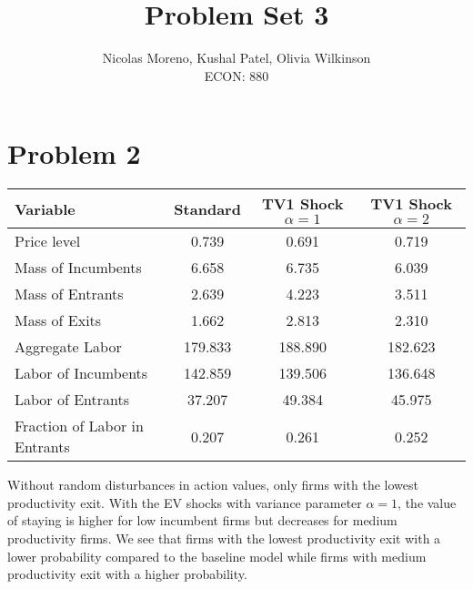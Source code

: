 \documentclass[10pt]{article}
\begin{document}
 
\title{Problem Set 3}
\author{Nicolas Moreno, Kushal Patel, Olivia Wilkinson \\
ECON: 880}
\maketitle

\section{Problem 2}
\begin{table}[!h]
    \centering
    \begin{tabular}{@{}lccc@{}}
    \toprule
    \textbf{Variable}             & \textbf{Standard} & \textbf{TV1 Shock $\alpha = 1$} & \textbf{TV1 Shock $\alpha = 2$} \\ \midrule
    Price level                   & 0.739             & 0.691                           & 0.719                           \\
    Mass of Incumbents            & 6.658             & 6.735                           & 6.039                           \\
    Mass of Entrants              & 2.639             & 4.223                           & 3.511                           \\
    Mass of Exits                 & 1.662             & 2.813                           & 2.310                           \\
    Aggregate Labor               & 179.833           & 188.890                         & 182.623                        \\
    Labor of Incumbents           & 142.859           & 139.506                         & 136.648                         \\
    Labor of Entrants             & 37.207            & 49.384                          & 45.975                          \\
    Fraction of Labor in Entrants & 0.207             & 0.261                           & 0.252                           \\ \bottomrule
    \end{tabular}
\end{table}

Without random disturbances in action values, only firms with the lowest productivity exit. With the EV shocks with variance parameter $\alpha = 1$, 
the value of staying is higher for low incumbent firms but decreases for medium productivity firms. We see that firms with the lowest productivity exit with a 
lower probability compared to the baseline model while firms with medium productivity exit with a higher probability. 
\end{document}
